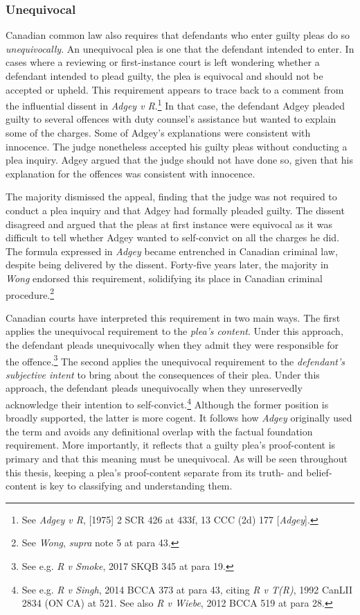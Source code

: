 \subsubsection{Unequivocal}

Canadian common law also requires that defendants who enter guilty pleas do so \textit{unequivocally}. An unequivocal plea is one that the defendant intended to enter. In cases where a reviewing or first-instance court is left wondering whether a defendant intended to plead guilty, the plea is equivocal and should not be accepted or upheld. This requirement appears to trace back to a comment from the influential dissent in \textit{Adgey v R}.\footnote{See \textit{Adgey v R}, [1975] 2 SCR 426 at 433f, 13 CCC (2d) 177 [\textit{Adgey}].} In that case, the defendant Adgey pleaded guilty to several offences with duty counsel's assistance but wanted to explain some of the charges. Some of Adgey's explanations were consistent with innocence. The judge nonetheless accepted his guilty pleas without conducting a plea inquiry. Adgey argued that the judge should not have done so, given that his explanation for the offences was consistent with innocence. 

The majority dismissed the appeal, finding that the judge was not required to conduct a plea inquiry and that Adgey had formally pleaded guilty. The dissent disagreed and argued that the pleas at first instance were equivocal as it was difficult to tell whether Adgey wanted to self-convict on all the charges he did. The formula expressed in \textit{Adgey} became entrenched in Canadian criminal law, despite being delivered by the dissent. Forty-five years later, the majority in \textit{Wong} endorsed this requirement, solidifying its place in Canadian criminal procedure.\footnote{See \textit{Wong}, \textit{supra} note 5 at para 43.}

Canadian courts have interpreted this requirement in two main ways. The first applies the unequivocal requirement to the \textit{plea's content}. Under this approach, the defendant pleads unequivocally when they admit they were responsible for the offence.\footnote{See e.g. \textit{R v Smoke}, 2017 SKQB 345 at para 19.} The second applies the unequivocal requirement to the \textit{defendant's subjective intent} to bring about the consequences of their plea. Under this approach, the defendant pleads unequivocally when they unreservedly acknowledge their intention to self-convict.\footnote{See e.g. \textit{R v Singh}, 2014 BCCA 373 at para 43, citing \textit{R v T(R)}, 1992 CanLII 2834 (ON CA) at 521. See also \textit{R v Wiebe}, 2012 BCCA 519 at para 28.} Although the former position is broadly supported, the latter is more cogent. It follows how \textit{Adgey} originally used the term and avoids any definitional overlap with the factual foundation requirement. More importantly, it reflects that a guilty plea's proof-content is primary and that this meaning must be unequivocal. As will be seen throughout this thesis, keeping a plea's proof-content separate from its truth- and belief-content is key to classifying and understanding them.